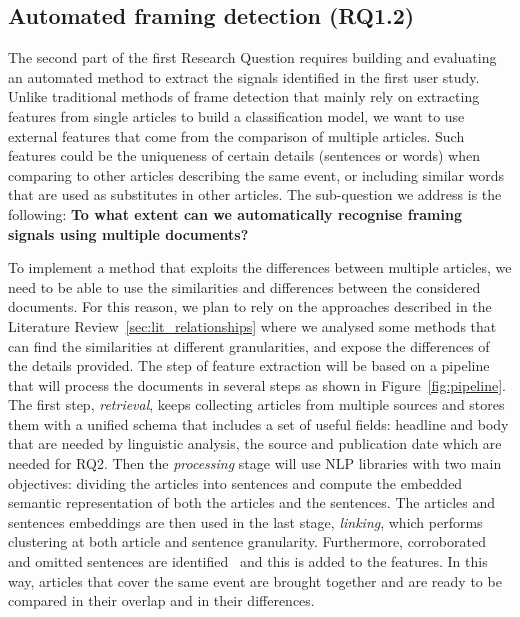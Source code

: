 \subsection{Automated framing detection (RQ1.2)}

The second part of the first Research Question requires building and evaluating an automated method to extract the signals identified in the first user study.
Unlike traditional methods of frame detection that mainly rely on extracting features from single articles to build a classification model, we want to use external features that come from the comparison of multiple articles. Such features could be the uniqueness of certain details (sentences or words) when comparing to other articles describing the same event, or including similar words that are used as substitutes in other articles.
The sub-question we address is the following:
\textbf{To what extent can we automatically recognise framing signals using multiple documents?}

To implement a method that exploits the differences between multiple articles, we need to be able to use the similarities and differences between the considered documents.
For this reason, we plan to rely on the approaches described in the Literature Review~\ref{sec:lit_relationships} where we analysed some methods that can find the similarities at different granularities, and expose the differences of the details provided.
The step of feature extraction will be based on a pipeline that will process the documents in several steps as shown in Figure~\ref{fig:pipeline}.
The first step, \emph{retrieval}, keeps collecting articles from multiple sources and stores them with a unified schema that includes a set of useful fields: headline and body that are needed by linguistic analysis, the source and publication date which are needed for RQ2.
Then the \emph{processing} stage will use NLP libraries with two main objectives: dividing the articles into sentences and compute the embedded semantic representation of both the articles and the sentences.
The articles and sentences embeddings are then used in the last stage, \emph{linking}, which performs clustering at both article and sentence granularity. Furthermore, corroborated and omitted sentences are identified~\cite{bountouridis2018explaining} and this is added to the features.
In this way, articles that cover the same event are brought together and are ready to be compared in their overlap and in their differences.

